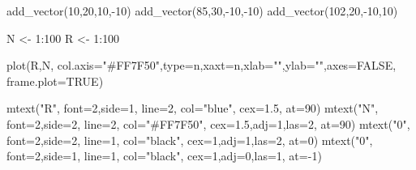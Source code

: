 \documentclass[
  a4paper,
]{scrbook}
\newenvironment{Shaded}{\begin{snugshade}}{\end{snugshade}}
\newcommand{\AttributeTok}[1]{\textcolor[rgb]{0.40,0.45,0.13}{#1}}
\newcommand{\ConstantTok}[1]{\textcolor[rgb]{0.56,0.35,0.01}{#1}}
\newcommand{\DecValTok}[1]{\textcolor[rgb]{0.68,0.00,0.00}{#1}}
\newcommand{\FloatTok}[1]{\textcolor[rgb]{0.68,0.00,0.00}{#1}}
\newcommand{\FunctionTok}[1]{\textcolor[rgb]{0.28,0.35,0.67}{#1}}
\newcommand{\NormalTok}[1]{\textcolor[rgb]{0.00,0.23,0.31}{#1}}
\newcommand{\OtherTok}[1]{\textcolor[rgb]{0.00,0.23,0.31}{#1}}
\newcommand{\SpecialCharTok}[1]{\textcolor[rgb]{0.37,0.37,0.37}{#1}}
\newcommand{\StringTok}[1]{\textcolor[rgb]{0.13,0.47,0.30}{#1}}
\theoremstyle{definition}
\theoremstyle{remark}
\begin{document}
\begin{Shaded}
\begin{Highlighting}[]
\FunctionTok{add\_vector}\NormalTok{(}\DecValTok{10}\NormalTok{,}\DecValTok{20}\NormalTok{,}\DecValTok{10}\NormalTok{,}\SpecialCharTok{{-}}\DecValTok{10}\NormalTok{)}
\FunctionTok{add\_vector}\NormalTok{(}\DecValTok{85}\NormalTok{,}\DecValTok{30}\NormalTok{,}\SpecialCharTok{{-}}\DecValTok{10}\NormalTok{,}\SpecialCharTok{{-}}\DecValTok{10}\NormalTok{)}
\FunctionTok{add\_vector}\NormalTok{(}\DecValTok{102}\NormalTok{,}\DecValTok{20}\NormalTok{,}\SpecialCharTok{{-}}\DecValTok{10}\NormalTok{,}\DecValTok{10}\NormalTok{)}

\NormalTok{N }\OtherTok{\textless{}{-}} \DecValTok{1}\SpecialCharTok{:}\DecValTok{100}
\NormalTok{R }\OtherTok{\textless{}{-}} \DecValTok{1}\SpecialCharTok{:}\DecValTok{100}

\FunctionTok{plot}\NormalTok{(R,N,  }\AttributeTok{col.axis=}\StringTok{"\#FF7F50"}\NormalTok{,}\AttributeTok{type=}\StringTok{\textquotesingle{}n\textquotesingle{}}\NormalTok{,}\AttributeTok{xaxt=}\StringTok{\textquotesingle{}n\textquotesingle{}}\NormalTok{,}\AttributeTok{xlab=}\StringTok{""}\NormalTok{,}\AttributeTok{ylab=}\StringTok{""}\NormalTok{,}\AttributeTok{axes=}\ConstantTok{FALSE}\NormalTok{, }\AttributeTok{frame.plot=}\ConstantTok{TRUE}\NormalTok{)}

\FunctionTok{mtext}\NormalTok{(}\StringTok{"R"}\NormalTok{, }\AttributeTok{font=}\DecValTok{2}\NormalTok{,}\AttributeTok{side=}\DecValTok{1}\NormalTok{, }\AttributeTok{line=}\DecValTok{2}\NormalTok{, }\AttributeTok{col=}\StringTok{"blue"}\NormalTok{, }\AttributeTok{cex=}\FloatTok{1.5}\NormalTok{, }\AttributeTok{at=}\DecValTok{90}\NormalTok{)}
\FunctionTok{mtext}\NormalTok{(}\StringTok{"N"}\NormalTok{, }\AttributeTok{font=}\DecValTok{2}\NormalTok{,}\AttributeTok{side=}\DecValTok{2}\NormalTok{, }\AttributeTok{line=}\DecValTok{2}\NormalTok{, }\AttributeTok{col=}\StringTok{"\#FF7F50"}\NormalTok{, }\AttributeTok{cex=}\FloatTok{1.5}\NormalTok{,}\AttributeTok{adj=}\DecValTok{1}\NormalTok{,}\AttributeTok{las=}\DecValTok{2}\NormalTok{, }\AttributeTok{at=}\DecValTok{90}\NormalTok{)}
\FunctionTok{mtext}\NormalTok{(}\StringTok{"0"}\NormalTok{, }\AttributeTok{font=}\DecValTok{2}\NormalTok{,}\AttributeTok{side=}\DecValTok{2}\NormalTok{, }\AttributeTok{line=}\DecValTok{1}\NormalTok{, }\AttributeTok{col=}\StringTok{"black"}\NormalTok{, }\AttributeTok{cex=}\DecValTok{1}\NormalTok{,}\AttributeTok{adj=}\DecValTok{1}\NormalTok{,}\AttributeTok{las=}\DecValTok{2}\NormalTok{, }\AttributeTok{at=}\DecValTok{0}\NormalTok{)}
\FunctionTok{mtext}\NormalTok{(}\StringTok{"0"}\NormalTok{, }\AttributeTok{font=}\DecValTok{2}\NormalTok{,}\AttributeTok{side=}\DecValTok{1}\NormalTok{, }\AttributeTok{line=}\DecValTok{1}\NormalTok{, }\AttributeTok{col=}\StringTok{"black"}\NormalTok{, }\AttributeTok{cex=}\DecValTok{1}\NormalTok{,}\AttributeTok{adj=}\DecValTok{0}\NormalTok{,}\AttributeTok{las=}\DecValTok{1}\NormalTok{, }\AttributeTok{at=}\SpecialCharTok{{-}}\DecValTok{1}\NormalTok{)}


\end{Highlighting}
\end{Shaded}
\end{document}
